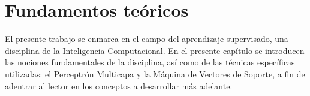 \chapter{Fundamentos teóricos}
El presente trabajo se enmarca en el campo del aprendizaje
supervisado, una disciplina de la Inteligencia Computacional.  En el
presente capítulo se introducen las nociones fundamentales de la
disciplina, así como de las técnicas específicas utilizadas: el
Perceptrón Multicapa y la Máquina de Vectores de Soporte, a fin de
adentrar al lector en los conceptos a desarrollar más adelante.
